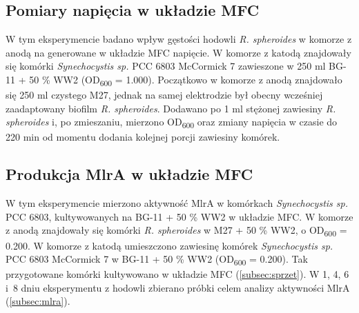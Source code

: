 \subsection{Pomiary napięcia w układzie MFC}\label{subsec:volt}
W tym eksperymencie badano wpływ gęstości hodowli
\textit{R. spheroides} w komorze z anodą na generowane
w układzie MFC napięcie.
W komorze z katodą znajdowały się komórki
\textit{Synechocystis sp.} PCC 6803 McCormick 7
zawieszone w 250 ml BG-11 + 50 \% WW2
(OD\textsubscript{600} = 1.000).
Początkowo w komorze z anodą znajdowało się 250 ml
czystego M27, jednak na samej elektrodzie był
obecny wcześniej zaadaptowany biofilm \textit{R. spheroides}.
Dodawano po 1 ml stężonej zawiesiny \textit{R. spheroides}
i, po zmieszaniu, mierzono OD\textsubscript{600} oraz
zmiany napięcia w czasie do 220 min od momentu dodania
kolejnej porcji zawiesiny komórek.

\subsection{Produkcja MlrA w układzie MFC}\label{subsec:mfc}
W tym eksperymencie mierzono aktywność MlrA
w komórkach \textit{Synechocystis sp.} PCC 6803,
kultywowanych na BG-11 + 50 \% WW2 w układzie MFC\@.
W komorze z anodą znajdowały się komórki
\textit{R. spheroides} w M27 + 50 \% WW2,
o OD\textsubscript{600} = 0.200.
W komorze z katodą umieszczono zawiesinę komórek
\textit{Synechocystis sp.} PCC 6803 McCormick 7
w BG-11 + 50 \% WW2 (OD\textsubscript{600} = 0.200).
Tak przygotowane komórki kultywowano w układzie MFC (\ref{subsec:sprzet}).
W 1, 4, 6 i~8 dniu eksperymentu z hodowli zbierano próbki
celem analizy aktywności MlrA (\ref{subsec:mlra}).